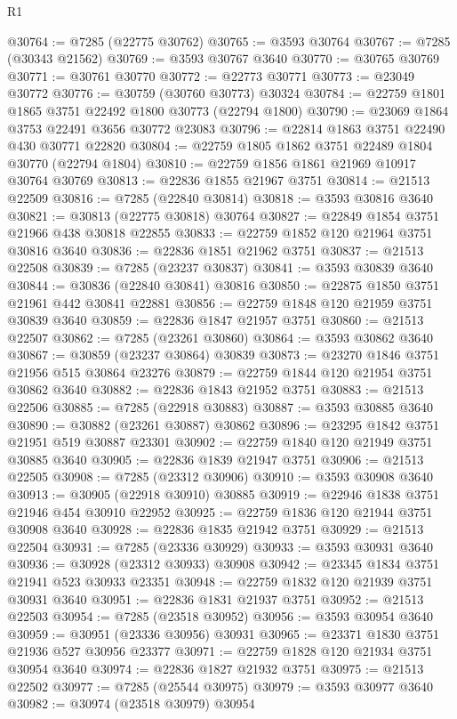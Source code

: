 \begin{lexlean}{R1}
\begin{coremodule}
@30764 := @7285 (@22775 @30762)
@30765 := @3593 @30764
@30767 := @7285 (@30343 @21562)
@30769 := @3593 @30767 @3640
@30770 := @30765 @30769
@30771 := @30761 @30770
@30772 := @22773 @30771
@30773 := @23049 @30772
@30776 := @30759 (@30760 @30773) @30324
@30784 := @22759 @1801 @1865 @3751 @22492 @1800 @30773 (@22794 @1800)
@30790 := @23069 @1864 @3753 @22491 @3656 @30772 @23083
@30796 := @22814 @1863 @3751 @22490 @430 @30771 @22820
@30804 := @22759 @1805 @1862 @3751 @22489 @1804 @30770 (@22794 @1804)
@30810 := @22759 @1856 @1861 @21969 @10917 @30764 @30769
@30813 := @22836 @1855 @21967 @3751
@30814 := @21513 @22509
@30816 := @7285 (@22840 @30814)
@30818 := @3593 @30816 @3640
@30821 := @30813 (@22775 @30818) @30764
@30827 := @22849 @1854 @3751 @21966 @438 @30818 @22855
@30833 := @22759 @1852 @120 @21964 @3751 @30816 @3640
@30836 := @22836 @1851 @21962 @3751
@30837 := @21513 @22508
@30839 := @7285 (@23237 @30837)
@30841 := @3593 @30839 @3640
@30844 := @30836 (@22840 @30841) @30816
@30850 := @22875 @1850 @3751 @21961 @442 @30841 @22881
@30856 := @22759 @1848 @120 @21959 @3751 @30839 @3640
@30859 := @22836 @1847 @21957 @3751
@30860 := @21513 @22507
@30862 := @7285 (@23261 @30860)
@30864 := @3593 @30862 @3640
@30867 := @30859 (@23237 @30864) @30839
@30873 := @23270 @1846 @3751 @21956 @515 @30864 @23276
@30879 := @22759 @1844 @120 @21954 @3751 @30862 @3640
@30882 := @22836 @1843 @21952 @3751
@30883 := @21513 @22506
@30885 := @7285 (@22918 @30883)
@30887 := @3593 @30885 @3640
@30890 := @30882 (@23261 @30887) @30862
@30896 := @23295 @1842 @3751 @21951 @519 @30887 @23301
@30902 := @22759 @1840 @120 @21949 @3751 @30885 @3640
@30905 := @22836 @1839 @21947 @3751
@30906 := @21513 @22505
@30908 := @7285 (@23312 @30906)
@30910 := @3593 @30908 @3640
@30913 := @30905 (@22918 @30910) @30885
@30919 := @22946 @1838 @3751 @21946 @454 @30910 @22952
@30925 := @22759 @1836 @120 @21944 @3751 @30908 @3640
@30928 := @22836 @1835 @21942 @3751
@30929 := @21513 @22504
@30931 := @7285 (@23336 @30929)
@30933 := @3593 @30931 @3640
@30936 := @30928 (@23312 @30933) @30908
@30942 := @23345 @1834 @3751 @21941 @523 @30933 @23351
@30948 := @22759 @1832 @120 @21939 @3751 @30931 @3640
@30951 := @22836 @1831 @21937 @3751
@30952 := @21513 @22503
@30954 := @7285 (@23518 @30952)
@30956 := @3593 @30954 @3640
@30959 := @30951 (@23336 @30956) @30931
@30965 := @23371 @1830 @3751 @21936 @527 @30956 @23377
@30971 := @22759 @1828 @120 @21934 @3751 @30954 @3640
@30974 := @22836 @1827 @21932 @3751
@30975 := @21513 @22502
@30977 := @7285 (@25544 @30975)
@30979 := @3593 @30977 @3640
@30982 := @30974 (@23518 @30979) @30954

\end{coremodule}
\end{lexlean}
